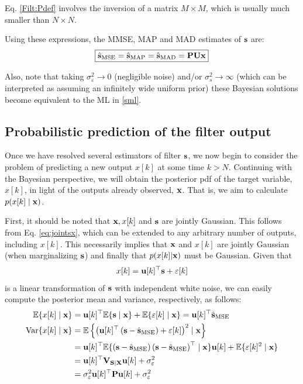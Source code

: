 Eq. \eqref{Filt:Pdef} involves the inversion of a matrix $M \times M$, which is usually much smaller than $N\times N$. 

Using these expressions, the MMSE, MAP and MAD estimates of ${\mathbf s}$ are:
\begin{equation}
\boxed{\hat{{\mathbf s}}_\text{MSE} =\hat{{\mathbf s}}_\text{MAP} =\hat{{\mathbf s}}_\text{MAD} = {\mathbf P}  {\mathbf U} {\mathbf x}}
\label{smmse}
\end{equation}

Also, note that taking $\sigma_\varepsilon^2\rightarrow 0$ (negligible noise) and/or $\sigma_s^2\rightarrow\infty$ (which can be interpreted as assuming an infinitely wide uniform prior) these Bayesian solutions become equivalent to the ML in \eqref{sml}.


\subsection{Probabilistic prediction of the filter output}

Once we have resolved several estimators of filter ${\mathbf s}$, we now begin to consider the problem of predicting a new output $x[k]$ at some time $k>N$. Continuing with the Bayesian perspective, we will obtain the posterior pdf of the target variable, $x[k]$, in light of the outputs already observed, ${\mathbf x}$. That is, we aim to calculate $p (x[k] \mid {\mathbf x})$.

First, it should be noted that ${\mathbf x}, x[k]$ and ${\mathbf s}$ are jointly Gaussian. This follows from Eq. \eqref{eq:jointsx}, which can be extended to any arbitrary number of outputs, including $x[k]$. This necessarily implies that ${\mathbf x}$ and $x[k]$ are jointly Gaussian (when marginalizing ${\mathbf s}$) and finally that $p(x[k] | {\mathbf x}) $ must be Gaussian. Given that
\begin{equation}
x[k] = {\mathbf u}[k]^\top{\mathbf s}+\varepsilon[k]
\end{equation}
is a linear transformation of ${\mathbf s}$ with independent white noise, we can easily compute the posterior mean and variance, respectively, as follows:
\begin{align}
\mathbb{E}\{x[k]\mid {\mathbf x}\} &= {\mathbf u}[k]^\top\mathbb{E}\{{\mathbf s}\mid {\mathbf x}\} + \mathbb{E}\{\varepsilon[k] \mid{\mathbf x}\}
                    = {\mathbf u}[k]^\top\hat{{\mathbf s}}_\text{MSE}   \\
\text{Var}\{x[k] \mid {\mathbf x}\} 
	&= \mathbb{E}\left\{\left({\mathbf u}[k]^\top \left({\mathbf s}-\hat{{\mathbf s}}_\text{MSE}\right) 
	             + \varepsilon[k] \right)^2 \mid{\mathbf x} \right\}   \nonumber\\
    &= {\mathbf u}[k]^\top \mathbb{E}\{\left({\mathbf s}-\hat{{\mathbf s}}_\text{MSE}\right)\left({\mathbf s}-\hat{{\mathbf s}}_\text{MSE}\right)^\top 
                        \mid {\mathbf x}\} {\mathbf u}[k]
       + \mathbb{E}\{\varepsilon[k]^2 \mid{\mathbf x}\}    \nonumber\\
    &= {\mathbf u}[k]^\top {\bf V}_{{\bf S}|{\bf X}} {\mathbf u}[k] + \sigma_\varepsilon^2   \nonumber\\
    &= \sigma_\varepsilon^2 {\mathbf u}[k]^\top {\mathbf P} {\mathbf u}[k] + \sigma_\varepsilon^2
\end{align}

